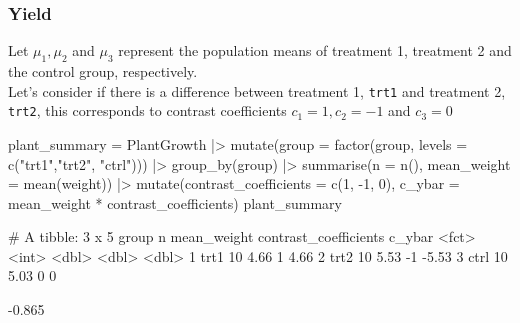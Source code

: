 \documentclass[a4paper]{article}
\begin{document}
\subsubsection{Yield}
Let \( \mu_1,\mu_2 \) and \( \mu_3 \) represent the population means of treatment 1, treatment 2 and the control group, respectively.\\
Let's consider if there is a difference between treatment 1, \lstinline|trt1| and treatment 2, \lstinline|trt2|, this corresponds to contrast coefficients \( c_1 = 1, c_2 = -1 \) and \( c_3 = 0 \)
\begin{Schunk}
\begin{Sinput}
plant_summary = PlantGrowth |> 
  mutate(group = factor(group, levels = c("trt1","trt2", "ctrl"))) |> 
  group_by(group) |> 
  summarise(n = n(), mean_weight = mean(weight)) |> 
  mutate(contrast_coefficients = c(1, -1, 0),
         c_ybar = mean_weight * contrast_coefficients)
plant_summary
\end{Sinput}
\begin{Soutput}
# A tibble: 3 x 5
  group     n mean_weight contrast_coefficients c_ybar
  <fct> <int>       <dbl>                 <dbl>  <dbl>
1 trt1     10        4.66                     1   4.66
2 trt2     10        5.53                    -1  -5.53
3 ctrl     10        5.03                     0   0   
\end{Soutput}
\begin{Soutput}
[1] -0.865
\end{Soutput}
\end{Schunk}
\end{document}
